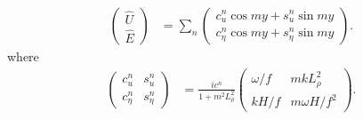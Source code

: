 \documentclass[10pt,reqno]{amsart}
\begin{document}
\begin{align}
\begin{pmatrix}
\hat{U} \\
\hat{E}
\end{pmatrix} & = 
\sum_n \begin{pmatrix}
c_u^n \cos m y  + s_u^n \sin m y \\
c_\eta^n  \cos m y  + s_\eta^n \sin m y
\end{pmatrix} .
\label{eqn:channel_U_hat_E_hat_convenient}
\end{align}
where
\begin{align}
\begin{pmatrix}
c_u^n & s_u^n  \\
c_\eta^n & s_\eta^n
\end{pmatrix} & = 
\frac{i c^n}{1 + m^2 L_\rho^2}
\begin{pmatrix}
\omega / f & m k L_\rho^2 \\
k H/f  & m \omega H / f^2 
\end{pmatrix} .
\label{eq:channel_u_eta_IGW_coeffs} 
\end{align}
\end{document}
